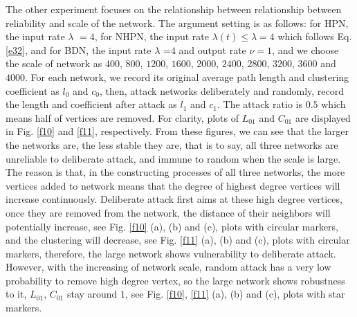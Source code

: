 \documentclass[final]{IEEEtran}
\begin{document}




The other experiment focuses on the relationship between
relationship between reliability and scale of the network. The
argument setting is as follows: for HPN, the input rate $\lambda$
$=$$4$, for NHPN, the input rate $\lambda (t)$$ \leq $$\lambda$$
=4$ which follows Eq. \ref{e32}, and for BDN, the input rate
$\lambda $ =$4$ and output rate $\nu$$=$$1$, and we choose the
scale of network as $400$, $800$, $1200$, $1600$, $2000$, $2400$,
$2800$, $3200$, $3600$ and $4000$. For each network, we record its
original average path length and clustering coefficient as $l_{0}$
and $c_{0}$, then, attack networks deliberately and randomly,
record the length and coefficient after attack as $l_{1}$ and
$c_{1}$. The attack ratio is $0.5$ which means half of vertices
are removed. For clarity, plots of $L_{01}$ and $C_{01}$ are
displayed in Fig. \ref{f10} and \ref{f11}, respectively. From
these figures, we can see that the larger the networks are, the
less stable they are, that is to say, all three networks are
unreliable to deliberate attack, and immune to random when the
scale is large. The reason is that, in the constructing processes
of all three networks, the more vertices added to network means
that the degree of highest degree vertices will increase
continuously. Deliberate attack first aims at these high degree
vertices, once they are removed from the network, the distance of
their neighbors will potentially increase, see Fig. \ref{f10} (a),
(b) and (c), plots with circular markers, and the clustering will
decrease, see Fig. \ref{f11} (a), (b) and (c), plots with circular
markers, therefore, the large network shows vulnerability to
deliberate attack. However, with the increasing of network scale,
random attack has a very low probability to remove high degree
vertex, so the large network shows robustness to it, $L_{01}$,
$C_{01}$ stay around $1$, see Fig. \ref{f10}, \ref{f11} (a), (b)
and (c), plots with star markers.
\end{document}
